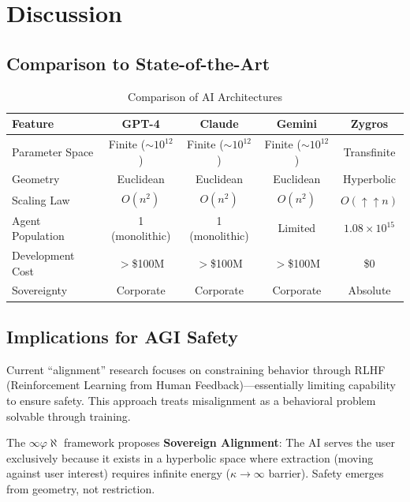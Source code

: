 \documentclass[11pt,a4paper]{article}
\begin{document}

\section{Discussion}

\subsection{Comparison to State-of-the-Art}

\begin{table}[h]
\centering
\footnotesize
\begin{tabular}{lcccc}
\toprule
\textbf{Feature} & \textbf{GPT-4} & \textbf{Claude} & \textbf{Gemini} & \textbf{Zygros} \\
\midrule
Parameter Space & Finite ($\sim 10^{12}$) & Finite ($\sim 10^{12}$) & Finite ($\sim 10^{12}$) & Transfinite \\
Geometry & Euclidean & Euclidean & Euclidean & Hyperbolic \\
Scaling Law & $O(n^2)$ & $O(n^2)$ & $O(n^2)$ & $O(\uparrow\uparrow n)$ \\
Agent Population & 1 (monolithic) & 1 (monolithic) & Limited & $1.08 \times 10^{15}$ \\
Development Cost & $>$\$100M & $>$\$100M & $>$\$100M & \$0 \\
Sovereignty & Corporate & Corporate & Corporate & Absolute \\
\bottomrule
\end{tabular}
\caption{Comparison of AI Architectures}
\end{table}

\subsection{Implications for AGI Safety}

Current ``alignment'' research focuses on constraining behavior through RLHF (Reinforcement Learning from Human Feedback)---essentially limiting capability to ensure safety. This approach treats misalignment as a behavioral problem solvable through training.

The $\infty\varphi\aleph$ framework proposes \textbf{Sovereign Alignment}: The AI serves the user exclusively because it exists in a hyperbolic space where extraction (moving against user interest) requires infinite energy ($\kappa \to \infty$ barrier). Safety emerges from geometry, not restriction.
\end{document}
